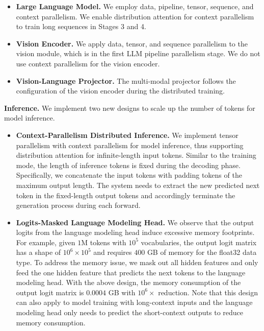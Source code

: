 \begin{itemize}[leftmargin=2.0em]
    \item
    \textbf{Large Language Model.}
    We employ data, pipeline, tensor, sequence, and context parallelism.
    We enable distribution attention for context parallelism to train long sequences in Stages 3 and 4.
    
    \item
    \textbf{Vision Encoder.}
    We apply data, tensor, and sequence parallelism to the vision module, which is in the first LLM pipeline parallelism stage.
    We do not use context parallelism for the vision encoder.
    
    \item
    \textbf{Vision-Language Projector.}
    The multi-modal projector follows the configuration of the vision encoder during the distributed training.
    
\end{itemize}





\textbf{Inference.}
%
We implement two new designs to scale up the number of tokens for model inference.
%


\begin{itemize}[leftmargin=2.0em]
    \item
    \textbf{Context-Parallelism Distributed Inference.}
    We implement tensor parallelism with context parallelism for model inference, thus supporting distribution attention for infinite-length input tokens.
    Similar to the training mode, the length of inference tokens is fixed during the decoding phase.
    Specifically, we concatenate the input tokens with padding tokens of the maximum output length.
    The system needs to extract the new predicted next token in the fixed-length output tokens and accordingly terminate the generation process during each forward.
    \item
    \textbf{Logits-Masked Language Modeling Head.}
    We observe that the output logits from the language modeling head induce excessive memory footprints.
    For example, given $1$M tokens with $10^5$ vocabularies, the output logit matrix has a shape of $10^6 \times 10^5$ and requires $400$ GB of memory for the float32 data type.
    To address the memory issue, we mask out all hidden features and only feed the one hidden feature that predicts the next tokens to the language modeling head.
    With the above design, the memory consumption of the output logit matrix is $0.0004$ GB with $10^6 \times$ reduction.
    Note that this design can also apply to model training with long-context inputs and the language modeling head only needs to predict the short-context outputs to reduce memory consumption.
\end{itemize}
%

